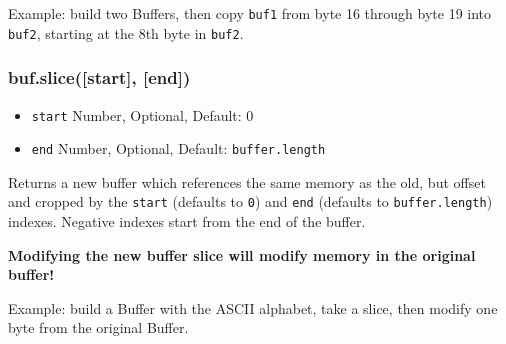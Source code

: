 Example: build two Buffers, then copy \texttt{buf1} from byte 16 through
byte 19 into \texttt{buf2}, starting at the 8th byte in \texttt{buf2}.

\begin{Shaded}
\begin{Highlighting}[]
 \NormalTok{);}
 \NormalTok{);}

 \NormalTok{(}   
  \NormalTok{; }
  \NormalTok{; }
\NormalTok{\}}

\NormalTok{, }\NormalTok{, }\NormalTok{);}
\NormalTok{(}\NormalTok{(}\NormalTok{, }\NormalTok{, }\NormalTok{));}

\end{Highlighting}
\end{Shaded}

\subsubsection{buf.slice({[}start{]}, {[}end{]})}

\begin{itemize}
\item
  \texttt{start} Number, Optional, Default: 0
\item
  \texttt{end} Number, Optional, Default: \texttt{buffer.length}
\end{itemize}

Returns a new buffer which references the same memory as the old, but
offset and cropped by the \texttt{start} (defaults to \texttt{0}) and
\texttt{end} (defaults to \texttt{buffer.length}) indexes. Negative
indexes start from the end of the buffer.

\textbf{Modifying the new buffer slice will modify memory in the
original buffer!}

Example: build a Buffer with the ASCII alphabet, take a slice, then
modify one byte from the original Buffer.

